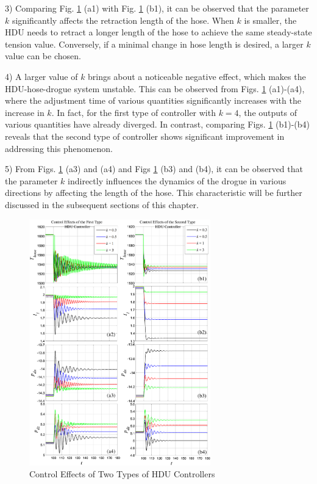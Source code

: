 3) Comparing Fig. \ref{F_Effects} (a1) with Fig. \ref{F_Effects} (b1), it can be observed that the parameter $k$ significantly affects the retraction length of the hose. When $k$ is smaller, the HDU needs to retract a longer length of the hose to achieve the same steady-state tension value. Conversely, if a minimal change in hose length is desired, a larger $k$ value can be chosen.

4) A larger value of $k$ brings about a noticeable negative effect, which makes the HDU-hose-drogue system unstable. This can be observed from Figs. \ref{F_Effects} (a1)-(a4), where the adjustment time of various quantities significantly increases with the increase in $k$. In fact, for the first type of controller with $k = 4$, the outputs of various quantities have already diverged. In contrast, comparing Figs. \ref{F_Effects} (b1)-(b4) reveals that the second type of controller shows significant improvement in addressing this phenomenon.

5) From Figs. \ref{F_Effects} (a3) and (a4) and Figs \ref{F_Effects} (b3) and (b4), it can be observed that the parameter $k$ indirectly influences the dynamics of the drogue in various directions by affecting the length of the hose. This characteristic will be further discussed in the subsequent sections of this chapter.
\begin{figure}[th]
	\centering
	\includegraphics[width=0.7\textwidth]{Figures/Figs_Ch8/Fig08}
	\caption{Control Effects of Two Types of HDU Controllers}\label{F_Effects}
\end{figure} 

